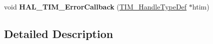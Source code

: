 \begin{DoxyCompactItemize}
\item 
void {\bfseries H\+A\+L\+\_\+\+T\+I\+M\+\_\+\+Error\+Callback} (\hyperlink{struct_t_i_m___handle_type_def}{T\+I\+M\+\_\+\+Handle\+Type\+Def} $\ast$htim)\hypertarget{group___t_i_m___exported___functions___group9_ga6f0868af383d592940700dbb52fac016}{}\label{group___t_i_m___exported___functions___group9_ga6f0868af383d592940700dbb52fac016}

\end{DoxyCompactItemize}


\subsection{Detailed Description}
